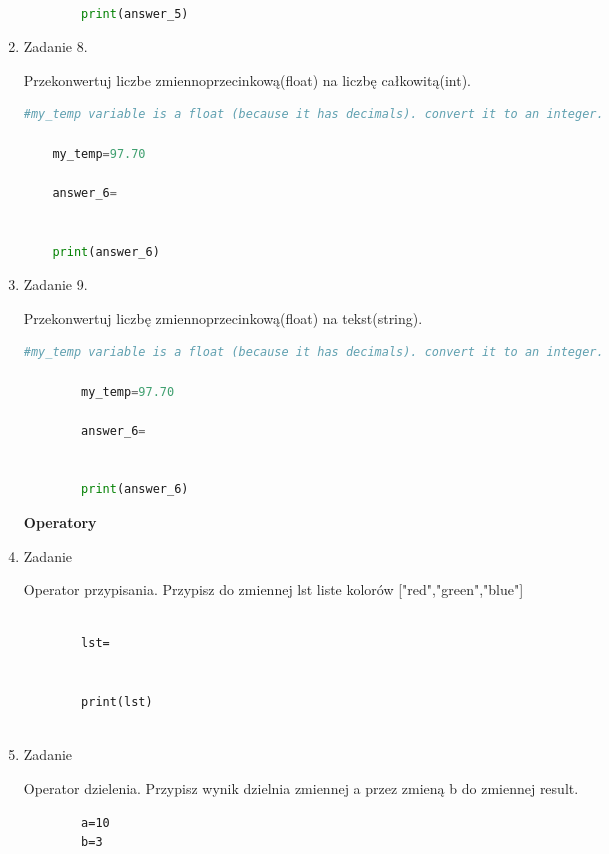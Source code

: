 \documentclass[11pt]{article}
\begin{document}
\begin{enumerate}
\begin{lstlisting}[language=Python]
		
		print(answer_5)
	\end{lstlisting}

	\item
	\begin{Large}
		Zadanie 8.
	\end{Large} 
	\par
	Przekonwertuj liczbe zmiennoprzecinkową(float) na liczbę całkowitą(int).
	\begin{lstlisting}[language=Python]
	#my_temp variable is a float (because it has decimals). convert it to an integer.
	
	my_temp=97.70
	
	answer_6=
	
	
	print(answer_6)
	\end{lstlisting}

		\item
	\begin{Large}
		Zadanie 9.
	\end{Large} 
	\par
	Przekonwertuj liczbę zmiennoprzecinkową(float) na tekst(string).
	\begin{lstlisting}[language=Python]
		#my_temp variable is a float (because it has decimals). convert it to an integer.
		
		my_temp=97.70
		
		answer_6=
		
		
		print(answer_6)
	\end{lstlisting}

\medskip
\begin{Large}
	\textbf{Operatory}
\end{Large}

	\item 
	\begin{Large}
		Zadanie
	\end{Large}
	\par
	Operator przypisania. Przypisz do zmiennej lst liste kolorów ["red","green","blue"]
	\begin{lstlisting}
		
		lst=
		
		
		print(lst)
		
	\end{lstlisting}

	\item 
	\begin{Large}
		Zadanie
	\end{Large}
	\par
	Operator dzielenia. Przypisz wynik dzielnia zmiennej a przez zmieną b do zmiennej result.
	\begin{lstlisting}
		a=10
		b=3
		

\end{lstlisting}
\end{enumerate}
\end{document}
